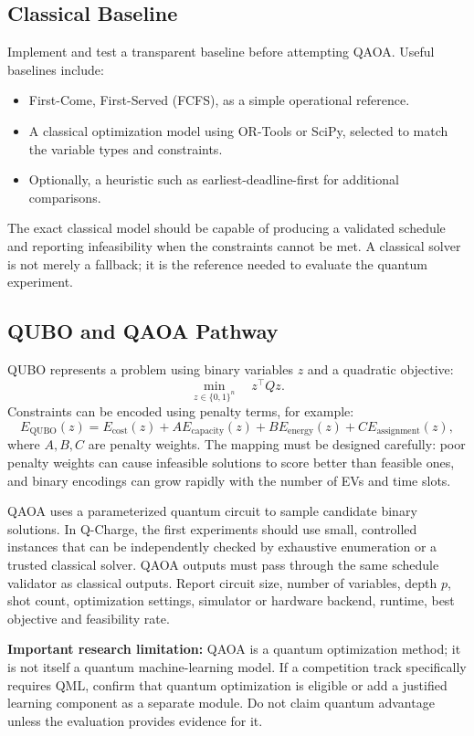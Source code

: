 \documentclass[11pt,a4paper]{article}
\begin{document}
\subsection{Classical Baseline}

Implement and test a transparent baseline before attempting QAOA. Useful baselines include:
\begin{itemize}
  \item First-Come, First-Served (FCFS), as a simple operational reference.
  \item A classical optimization model using OR-Tools or SciPy, selected to match the variable types and constraints.
  \item Optionally, a heuristic such as earliest-deadline-first for additional comparisons.
\end{itemize}

The exact classical model should be capable of producing a validated schedule and reporting infeasibility when the constraints cannot be met. A classical solver is not merely a fallback; it is the reference needed to evaluate the quantum experiment.

\subsection{QUBO and QAOA Pathway}

QUBO represents a problem using binary variables \(z\) and a quadratic objective:
\[
\min_{z\in\{0,1\}^n} \quad z^\top Qz.
\]
Constraints can be encoded using penalty terms, for example:
\[
E_{\mathrm{QUBO}}(z) =
E_{\mathrm{cost}}(z)
+ A E_{\mathrm{capacity}}(z)
+ B E_{\mathrm{energy}}(z)
+ C E_{\mathrm{assignment}}(z),
\]
where \(A,B,C\) are penalty weights. The mapping must be designed carefully: poor penalty weights can cause infeasible solutions to score better than feasible ones, and binary encodings can grow rapidly with the number of EVs and time slots.

QAOA uses a parameterized quantum circuit to sample candidate binary solutions. In Q-Charge, the first experiments should use small, controlled instances that can be independently checked by exhaustive enumeration or a trusted classical solver. QAOA outputs must pass through the same schedule validator as classical outputs. Report circuit size, number of variables, depth \(p\), shot count, optimization settings, simulator or hardware backend, runtime, best objective and feasibility rate.

\textbf{Important research limitation:} QAOA is a quantum optimization method; it is not itself a quantum machine-learning model. If a competition track specifically requires QML, confirm that quantum optimization is eligible or add a justified learning component as a separate module. Do not claim quantum advantage unless the evaluation provides evidence for it.
\end{document}
